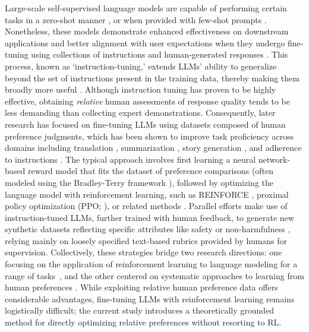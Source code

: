 Large-scale self-supervised language models are capable of performing certain tasks in a zero-shot manner \citep{radford2019language}, or when provided with few-shot prompts \citep{gpt3,megatron,chowdhery2022palm}. Nonetheless, these models demonstrate enhanced effectiveness on downstream applications and better alignment with user expectations when they undergo fine-tuning using collections of instructions and human-generated responses \citep{mishra-etal-2022-cross,sanh2022multitask,chung2022scaling,thoppilan2022lamda}. This process, known as ‘instruction-tuning,’ extends LLMs’ ability to generalize beyond the set of instructions present in the training data, thereby making them broadly more useful \citep{chung2022scaling}. Although instruction tuning has proven to be highly effective, obtaining \textit{relative} human assessments of response quality tends to be less demanding than collecting expert demonstrations. Consequently, later research has focused on fine-tuning LLMs using datasets composed of human preference judgments, which has been shown to improve task proficiency across domains including translation \citep{kreutzer-etal-2018-reliability}, summarization \citep{stiennon2022learning,ziegler2020finetuning}, story generation \citep{ziegler2020finetuning}, and adherence to instructions \citep{ouyang2022training,ramamurthy2023is}. The typical approach involves first learning a neural network-based reward model that fits the dataset of preference comparisons (often modeled using the Bradley-Terry framework \citep{bradley1952rankanalysis}), followed by optimizing the language model with reinforcement learning, such as REINFORCE \citep{williams1992reinforce}, proximal policy optimization (PPO; \cite{schulman2017proximal}), or related methods \citep{ramamurthy2023is}. Parallel efforts make use of instruction-tuned LLMs, further trained with human feedback, to generate new synthetic datasets reflecting specific attributes like safety or non-harmfulness \citep{bai2022constitutional}, relying mainly on loosely specified text-based rubrics provided by humans for supervision. Collectively, these strategies bridge two research directions: one focusing on the application of reinforcement learning to language modeling for a range of tasks~\citep{Ranzato2015SequenceLT,paulus2018a,wu2018learning}, and the other centered on systematic approaches to learning from human preferences \citep{christiano2017deep,kupcsik2018learning}. While exploiting relative human preference data offers considerable advantages, fine-tuning LLMs with reinforcement learning remains logistically difficult; the current study introduces a theoretically grounded method for directly optimizing relative preferences without resorting to RL.

